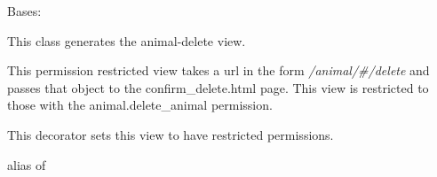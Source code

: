 \documentclass[letterpaper,10pt,english]{sphinxmanual}
\begin{document}
\begin{fulllineitems}
\label{api:mousedb.animal.views.AnimalDelete}
Bases: \href{http://docs.djangoproject.com/en/dev/ref/class-based-views/\#django.views.generic.edit.DeleteView}{}

This class generates the animal-delete view.

This permission restricted view takes a url in the form \emph{/animal/\#/delete} and passes that object to the confirm\_delete.html page.
This view is restricted to those with the animal.delete\_animal permission.

\begin{fulllineitems}
\label{api:mousedb.animal.views.AnimalDelete.context_object_name}
\end{fulllineitems}


\begin{fulllineitems}
\label{api:mousedb.animal.views.AnimalDelete.dispatch}
This decorator sets this view to have restricted permissions.

\end{fulllineitems}


\begin{fulllineitems}
\label{api:mousedb.animal.views.AnimalDelete.model}
alias of 

\end{fulllineitems}


\begin{fulllineitems}
\label{api:mousedb.animal.views.AnimalDelete.success_url}
\end{fulllineitems}


\begin{fulllineitems}
\label{api:mousedb.animal.views.AnimalDelete.template_name}
\end{fulllineitems}


\end{fulllineitems}
\end{document}
